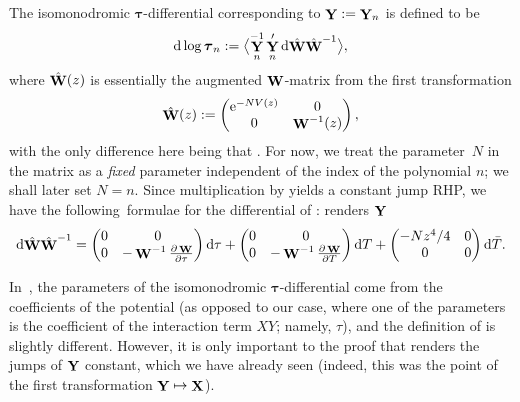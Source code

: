 \documentclass[pdftex]{sigma}
\DeclareMathOperator{\YY}{{\bf Y}}
\DeclareMathOperator{\XX}{{\bf X}}
\DeclareMathOperator{\WW}{{\bf W}}
\numberwithin{equation}{section}
\begin{document}
 The isomonodromic $\boldsymbol{\tau}$-differential corresponding to $\YY := \YY_n$ is defined to be
 \begin{equation*}
 {\rm d}\log \boldsymbol{\tau}_n := \bigl\langle \YY_n^{-1}\YY_n' {\rm d}\hat{\WW} \hat{\WW}^{-1}\bigr\rangle,
 \end{equation*}
 where $\hat{\WW}(z)$ is essentially the augmented $\WW$-matrix from the first transformation
 \begin{equation*}
 \hat{\WW}(z) :=
 \begin{pmatrix}
 {\rm e}^{-NV(z)} & 0 \\
 0 & \WW^{-1}(z)
 \end{pmatrix},
 \end{equation*}
 with the only difference here being that . For now, we treat the parameter~$N$ in the matrix \smash{$\hat{\WW}$} as a \textit{fixed} parameter independent of the index of the polynomial $n$; we shall later set $N = n$. Since multiplication by \smash{$\hat{\WW}$} yields a constant jump RHP, we have the following~formulae for the differential of \smash{${\rm d}\hat{\WW} \hat{\WW}^{-1}$}:
 renders $\YY$
 \begin{equation*}
 {\rm d}\hat{\WW} \hat{\WW}^{-1} =
 \begin{pmatrix}
 0 & 0\\
 0 & -\WW^{-1}\frac{\partial \WW }{\partial \tau}
 \end{pmatrix} {\rm d}\tau +
 \begin{pmatrix}
 0 & 0\\
 0 & -\WW^{-1}\frac{\partial\WW }{\partial T}
 \end{pmatrix} {\rm d}T
 + \begin{pmatrix}
 -Nz^4/4 & 0\\
 0 & 0
 \end{pmatrix} {\rm d}\bar{T}.
 \end{equation*}

In~\cite{Bertola-Marchal}, the parameters of the isomonodromic $\boldsymbol{\tau}$-differential come from the coefficients of the potential (as opposed to
our case, where one of the parameters is the coefficient of the interaction term $XY$; namely, $\tau$), and the
definition of \smash{${\rm d}\hat{\WW} \hat{\WW}^{-1}$} is slightly different. However, it is only important to the proof that \smash{$\hat{\WW}$} renders the jumps of $\YY$ constant, which we have already seen (indeed, this was the point of the first transformation $\YY\mapsto\XX$).
\end{document}
